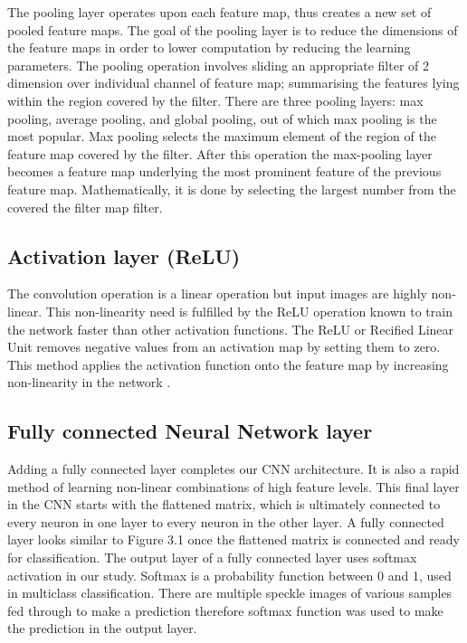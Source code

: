 The pooling layer operates upon each feature map, thus creates a new set of pooled feature maps. The goal of the pooling layer is to reduce the dimensions of the feature maps in order to lower computation by reducing the learning parameters. The pooling operation involves sliding an appropriate filter of 2 dimension over individual channel of feature map; summarising the features lying within the region covered by the filter. There are three pooling layers: max pooling, average pooling, and global pooling, out of which max pooling is the most popular. Max pooling selects the maximum element of the region of the feature map covered by the filter. After this operation the max-pooling layer becomes a feature map underlying the most prominent feature of the previous feature map. Mathematically, it is done by selecting the largest number from the covered the filter map filter.


\subsection{Activation layer (ReLU)}

The convolution operation is a linear operation but input images are highly non-linear. This non-linearity need is fulfilled by the ReLU operation known to train the network faster than other activation functions. The ReLU or Recified Linear Unit removes negative values from an activation map by setting them to zero. This method applies the activation function onto the feature map by increasing non-linearity in the network \citep{Jay}.


\subsection{Fully connected Neural Network layer}

Adding a fully connected layer completes our CNN architecture. It is also a rapid method of learning non-linear combinations of high feature levels. This final layer in the CNN starts with the flattened matrix, which is ultimately connected to every neuron in one layer to every neuron in the other layer. A fully connected layer looks similar to Figure 3.1 once the flattened matrix is connected and ready for classification. The output layer of a fully connected layer uses softmax activation in our study. Softmax is a probability function between 0 and 1, used in multiclass classification. There are multiple speckle images of various samples fed through to make a prediction therefore softmax function was used to make the prediction in the output layer. 

